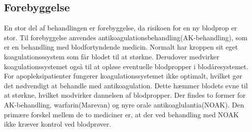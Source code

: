 \subsection{Forebyggelse}
En stor del af behandlingen er forebyggelse, da risikoen for en ny blodprop er stor. Til forebyggelse anvendes antikoagulationsbehandling(AK-behandling), som er en behandling med blodfortyndende medicin. Normalt har kroppen sit eget koagulationsssystem som får blodet til at størkne. Derudover medvirker koagulationssystemet også til at opløse eventuelle blodpropper i blodåresystemet. For apopleksipatienter fungerer koagulationssystemet ikke optimalt, hvilket gør det nødvendigt at behandle med antikoagulation. Dette hæmmer blodets evne til at størkne, hvilket modvirker dannelsen af blodpropper. Der findes to former for AK-behandling, warfarin(Marevan) og nyre orale antikoaglulantia(NOAK). Den primære forskel mellem de to mediciner er, at der ved behandling med NOAK ikke kræver kontrol ved blodprøver.\cite{Kjaergaard2015}

